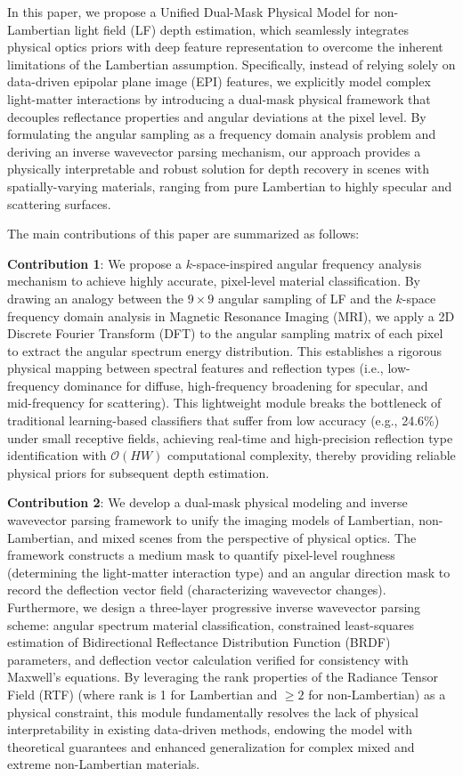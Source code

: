 \documentclass[journal]{IEEEtran}
\begin{document}
In this paper, we propose a Unified Dual-Mask Physical Model for non-Lambertian light field (LF) depth estimation, which seamlessly integrates physical optics priors with deep feature representation to overcome the inherent limitations of the Lambertian assumption. Specifically, instead of relying solely on data-driven epipolar plane image (EPI) features, we explicitly model complex light-matter interactions by introducing a dual-mask physical framework that decouples reflectance properties and angular deviations at the pixel level. By formulating the angular sampling as a frequency domain analysis problem and deriving an inverse wavevector parsing mechanism, our approach provides a physically interpretable and robust solution for depth recovery in scenes with spatially-varying materials, ranging from pure Lambertian to highly specular and scattering surfaces. 

The main contributions of this paper are summarized as follows:

\item \textbf{Contribution 1}: We propose a \(k\)-space-inspired angular frequency analysis mechanism to achieve highly accurate, pixel-level material classification. By drawing an analogy between the \(9 \times 9\) angular sampling of LF and the \(k\)-space frequency domain analysis in Magnetic Resonance Imaging (MRI), we apply a 2D Discrete Fourier Transform (DFT) to the angular sampling matrix of each pixel to extract the angular spectrum energy distribution. This establishes a rigorous physical mapping between spectral features and reflection types (i.e., low-frequency dominance for diffuse, high-frequency broadening for specular, and mid-frequency for scattering). This lightweight module breaks the bottleneck of traditional learning-based classifiers that suffer from low accuracy (e.g., 24.6\%) under small receptive fields, achieving real-time and high-precision reflection type identification with \(\mathcal{O}(HW)\) computational complexity, thereby providing reliable physical priors for subsequent depth estimation.

\item \textbf{Contribution 2}: We develop a dual-mask physical modeling and inverse wavevector parsing framework to unify the imaging models of Lambertian, non-Lambertian, and mixed scenes from the perspective of physical optics. The framework constructs a medium mask to quantify pixel-level roughness (determining the light-matter interaction type) and an angular direction mask to record the deflection vector field (characterizing wavevector changes). Furthermore, we design a three-layer progressive inverse wavevector parsing scheme: angular spectrum material classification, constrained least-squares estimation of Bidirectional Reflectance Distribution Function (BRDF) parameters, and deflection vector calculation verified for consistency with Maxwell's equations. By leveraging the rank properties of the Radiance Tensor Field (RTF) (where rank is 1 for Lambertian and \(\ge 2\) for non-Lambertian) as a physical constraint, this module fundamentally resolves the lack of physical interpretability in existing data-driven methods, endowing the model with theoretical guarantees and enhanced generalization for complex mixed and extreme non-Lambertian materials.
\end{document}
